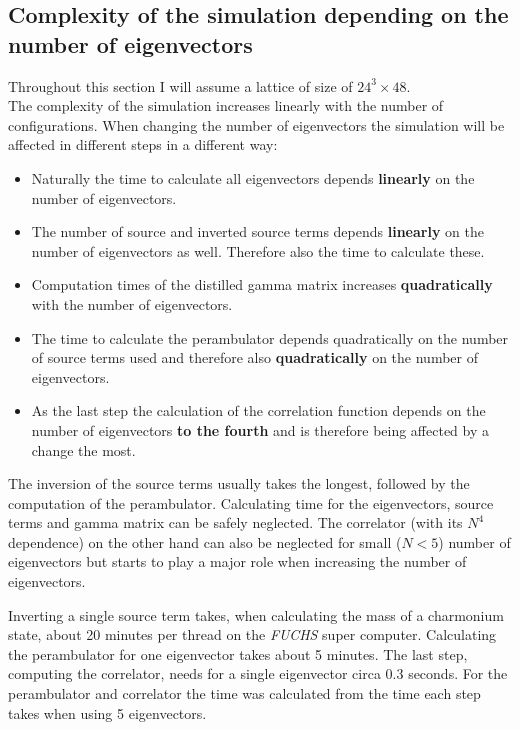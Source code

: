 \subsection{Complexity of the simulation depending on the number of eigenvectors}

Throughout this section I will assume a lattice of size of $24^3 \times 48$.\\

\noindent
The complexity of the simulation increases linearly with the number of configurations. When changing the number of eigenvectors the simulation will be affected in different steps in a different way:

\begin{itemize}
    \item Naturally the time to calculate all eigenvectors depends \textbf{linearly} on the number of eigenvectors.
    \item The number of source and inverted source terms depends \textbf{linearly} on the number of eigenvectors as well. Therefore also the time to calculate these.
    \item Computation times of the distilled gamma matrix increases \textbf{quadratically} with the number of eigenvectors.
    \item The time to calculate the perambulator depends quadratically on the number of source terms used and therefore also \textbf{quadratically} on the number of eigenvectors.
    \item As the last step the calculation of the correlation function depends on the number of eigenvectors \textbf{to the fourth} and is therefore being affected by a change the most.
\end{itemize}

\noindent
The inversion of the source terms usually takes the longest, followed by the computation of the perambulator. Calculating time for the eigenvectors, source terms and gamma matrix can be safely neglected. The correlator (with its $N^4$ dependence) on the other hand can also be neglected for small ($N<5$) number of eigenvectors but starts to play a major role when increasing the number of eigenvectors.

Inverting a single source term takes, when calculating the mass of a charmonium state, about 20 minutes per thread on the \textit{FUCHS} super computer. Calculating the perambulator for one eigenvector takes about 5 minutes. The last step, computing the correlator, needs for a single eigenvector circa 0.3 seconds. For the perambulator and correlator the time was calculated from the time each step takes when using 5 eigenvectors.

